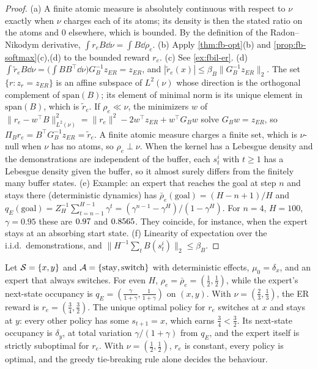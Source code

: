 \begin{proof}
(a) A finite atomic measure is absolutely continuous with respect to $\nu$ exactly when $\nu$ charges each of its atoms; its density is then the stated ratio on the atoms and $0$ elsewhere, which is bounded. By the definition of the Radon--Nikodym derivative, $\int r_eB\dd\nu=\int B\dd\rho_e$.
(b) Apply \cref{thm:fb-opt}(b) and \cref{prop:fb-softmax}(c),(d) to the bounded reward $r_e$.
(c) See \cref{ex:fbil-er}.
(d) $\int\tilde r_eB\dd\nu=\big(\int BB^\top\dd\nu\big)G_B^{-1}z_{ER}=z_{ER}$, and $|\tilde r_e(x)|\le\beta_B\|G_B^{-1}z_{ER}\|_2$.
The set $\{r:z_r=z_{ER}\}$ is an affine subspace of $L^2(\nu)$ whose direction is the orthogonal complement of $\mathrm{span}(B)$; its element of minimal norm is its unique element in $\mathrm{span}(B)$, which is $\tilde r_e$.
If $\rho_e\ll\nu$, the minimizers $w$ of $\|r_e-w^\top B\|^2_{L^2(\nu)}=\|r_e\|^2-2w^\top z_{ER}+w^\top G_Bw$ solve $G_Bw=z_{ER}$, so $\Pi_Br_e=B^\top G_B^{-1}z_{ER}=\tilde r_e$.
A finite atomic measure charges a finite set, which is $\nu$-null when $\nu$ has no atoms, so $\rho_e\perp\nu$. When the kernel has a Lebesgue density and the demonstrations are independent of the buffer, each $s^i_t$ with $t\ge1$ has a Lebesgue density given the buffer, so it almost surely differs from the finitely many buffer states.
(e) Example: an expert that reaches the goal at step $n$ and stays there (deterministic dynamics) has $\bar\rho_e(\mathrm{goal})=(H-n+1)/H$ and $q_E(\mathrm{goal})=Z_H^{-1}\sum_{t=n-1}^{H-1}\gamma^t=(\gamma^{n-1}-\gamma^H)/(1-\gamma^H)$.
For $n=4$, $H=100$, $\gamma=0.95$ these are $\vn{const.dwell.rho}{0.97}$ and $\vn{const.dwell.qE}{0.8565}$. They coincide, for instance, when the expert stays at an absorbing start state.
(f) Linearity of expectation over the i.i.d.\ demonstrations, and $\|H^{-1}\sum_tB(s^i_t)\|_2\le\beta_B$.
\end{proof}

\begin{example}\label{ex:fbil-er}
Let $\cS=\{x,y\}$ and $\cA=\{\text{stay},\text{switch}\}$ with deterministic effects, $\mu_0=\delta_x$, and an expert that always switches. For even $H$, $\rho_e=\bar\rho_e=(\frac12,\frac12)$, while the expert's next-state occupancy is $q_E=(\frac\gamma{1+\gamma},\frac1{1+\gamma})$ on $(x,y)$.
With $\nu=(\frac23,\frac13)$, the ER reward is $r_e=(\frac34,\frac32)$.
The unique optimal policy for $r_e$ switches at $x$ and stays at $y$: every other policy has some $s_{t+1}=x$, which earns $\frac34<\frac32$.
Its next-state occupancy is $\delta_y$, at total variation $\gamma/(1+\gamma)$ from $q_E$, and the expert itself is strictly suboptimal for $r_e$.
With $\nu=(\frac12,\frac12)$, $r_e$ is constant, every policy is optimal, and the greedy tie-breaking rule alone decides the behaviour.
\end{example}

